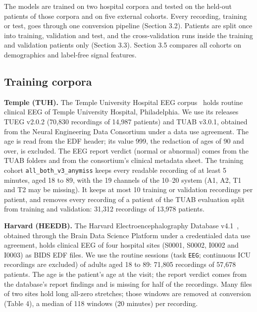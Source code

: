 \documentclass[11pt,a4paper]{article}
\begin{document}
The models are trained on two hospital corpora and tested on the held-out patients of those corpora and on five external cohorts. Every recording, training or test, goes through one conversion pipeline (Section 3.2). Patients are split once into training, validation and test, and the cross-validation runs inside the training and validation patients only (Section 3.3). Section 3.5 compares all cohorts on demographics and label-free signal features.

\subsection{Training corpora}

\textbf{Temple (TUH).} The Temple University Hospital EEG corpus~\citep{obeid2016tuh} holds routine clinical EEG of Temple University Hospital, Philadelphia. We use its releases TUEG v2.0.2 (70,830 recordings of 14,987 patients) and TUAB v3.0.1, obtained from the Neural Engineering Data Consortium under a data use agreement. The age is read from the EDF header; its value 999, the redaction of ages of 90 and over, is excluded. The EEG report verdict (normal or abnormal) comes from the TUAB folders and from the consortium's clinical metadata sheet. The training cohort \texttt{all\_both\_v3\_anymiss} keeps every readable recording of at least 5 minutes, aged 18 to 89, with the 19 channels of the 10--20 system (A1, A2, T1 and T2 may be missing). It keeps at most 10 training or validation recordings per patient, and removes every recording of a patient of the TUAB evaluation split from training and validation: 31,312 recordings of 13,978 patients.

\textbf{Harvard (HEEDB).} The Harvard Electroencephalography Database v4.1~\citep{heedb}, obtained through the Brain Data Science Platform under a credentialed data use agreement, holds clinical EEG of four hospital sites (S0001, S0002, I0002 and I0003) as BIDS EDF files. We use the routine sessions (task \texttt{EEG}; continuous ICU recordings are excluded) of adults aged 18 to 89: 71,805 recordings of 57,678 patients. The age is the patient's age at the visit; the report verdict comes from the database's report findings and is missing for half of the recordings. Many files of two sites hold long all-zero stretches; those windows are removed at conversion (Table 4), a median of 118 windows (20 minutes) per recording.
\end{document}
